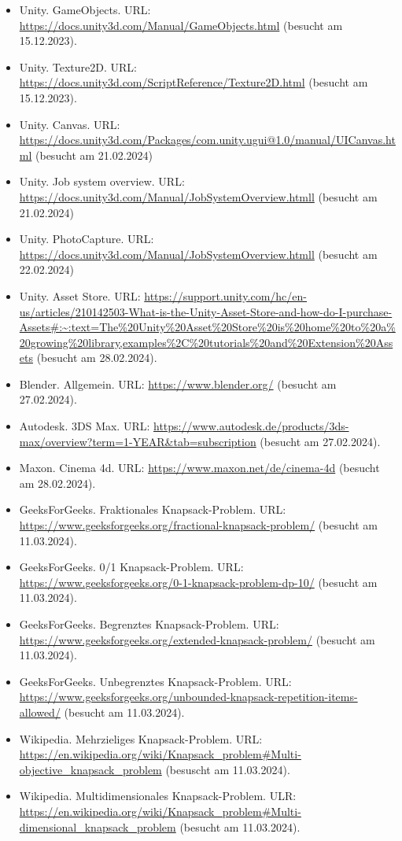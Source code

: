 \begin{itemize}
    \item Unity. GameObjects. URL: \url{https://docs.unity3d.com/Manual/GameObjects.html} (besucht am 15.12.2023).
    \item Unity. Texture2D. URL: \url{https://docs.unity3d.com/ScriptReference/Texture2D.html} (besucht am 15.12.2023).
    \item Unity. Canvas. URL: \url{https://docs.unity3d.com/Packages/com.unity.ugui@1.0/manual/UICanvas.html} (besucht am 21.02.2024)
    \item Unity. Job system overview. URL: \url{https://docs.unity3d.com/Manual/JobSystemOverview.htmll} (besucht am 21.02.2024)
    \item Unity. PhotoCapture. URL: \url{https://docs.unity3d.com/Manual/JobSystemOverview.htmll} (besucht am 22.02.2024)
    \item Unity. Asset Store. URL: \url{https://support.unity.com/hc/en-us/articles/210142503-What-is-the-Unity-Asset-Store-and-how-do-I-purchase-Assets#:~:text=The%20Unity%20Asset%20Store%20is%20home%20to%20a%20growing%20library,examples%2C%20tutorials%20and%20Extension%20Assets} (besucht am 28.02.2024).
    \item Blender. Allgemein. URL: \url{https://www.blender.org/} (besucht am 27.02.2024).
    \item Autodesk. 3DS Max. URL: \url{https://www.autodesk.de/products/3ds-max/overview?term=1-YEAR&tab=subscription} (besucht am 27.02.2024).
    \item Maxon. Cinema 4d. URL: \url{https://www.maxon.net/de/cinema-4d} (besucht am 28.02.2024).
    \item GeeksForGeeks. Fraktionales Knapsack-Problem. URL: \url{https://www.geeksforgeeks.org/fractional-knapsack-problem/} (besucht am 11.03.2024).
    \item GeeksForGeeks. 0/1 Knapsack-Problem. URL: \url{https://www.geeksforgeeks.org/0-1-knapsack-problem-dp-10/} (besucht am 11.03.2024).
    \item GeeksForGeeks. Begrenztes Knapsack-Problem. URL: \url{https://www.geeksforgeeks.org/extended-knapsack-problem/} (besucht am 11.03.2024).
    \item GeeksForGeeks. Unbegrenztes Knapsack-Problem. URL: \url{https://www.geeksforgeeks.org/unbounded-knapsack-repetition-items-allowed/} (besucht am 11.03.2024).
    \item Wikipedia. Mehrzieliges Knapsack-Problem. URL: \url{https://en.wikipedia.org/wiki/Knapsack_problem#Multi-objective_knapsack_problem} (besuscht am 11.03.2024).
    \item Wikipedia. Multidimensionales Knapsack-Problem. ULR: \url{https://en.wikipedia.org/wiki/Knapsack_problem#Multi-dimensional_knapsack_problem} (besucht am 11.03.2024).

\end{itemize}
